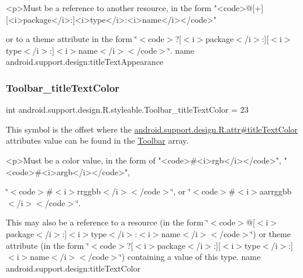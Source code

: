 \begin{DoxyVerb}      <p>Must be a reference to another resource, in the form "<code>@[+][<i>package</i>:]<i>type</i>:<i>name</i></code>"
\end{DoxyVerb}
 or to a theme attribute in the form \char`\"{}$<$code$>$?\mbox{[}$<$i$>$package$<$/i$>$\+:\mbox{]}\mbox{[}$<$i$>$type$<$/i$>$\+:\mbox{]}$<$i$>$name$<$/i$>$$<$/code$>$\char`\"{}.  name android.\+support.\+design\+:title\+Text\+Appearance \mbox{\label{classandroid_1_1support_1_1design_1_1R_1_1styleable_a604b5e782f3ef15da00397e90979933b}} 
\subsubsection{\texorpdfstring{Toolbar\+\_\+title\+Text\+Color}{Toolbar\_titleTextColor}}
{\footnotesize\ttfamily int android.\+support.\+design.\+R.\+styleable.\+Toolbar\+\_\+title\+Text\+Color = 23\hspace{0.3cm}{\ttfamily [static]}}

This symbol is the offset where the \hyperlink{classandroid_1_1support_1_1design_1_1R_1_1attr_a08459d5006ee4c06955351a45afbcbf0}{android.\+support.\+design.\+R.\+attr\#title\+Text\+Color} attribute\textquotesingle{}s value can be found in the \hyperlink{classandroid_1_1support_1_1design_1_1R_1_1styleable_a7783ebe780dbe2a845802a40519a46e9}{Toolbar} array.

\begin{DoxyVerb}      <p>Must be a color value, in the form of "<code>#<i>rgb</i></code>", "<code>#<i>argb</i></code>",
\end{DoxyVerb}
 \char`\"{}$<$code$>$\#$<$i$>$rrggbb$<$/i$>$$<$/code$>$\char`\"{}, or \char`\"{}$<$code$>$\#$<$i$>$aarrggbb$<$/i$>$$<$/code$>$\char`\"{}. 

This may also be a reference to a resource (in the form \char`\"{}$<$code$>$@\mbox{[}$<$i$>$package$<$/i$>$\+:\mbox{]}$<$i$>$type$<$/i$>$\+:$<$i$>$name$<$/i$>$$<$/code$>$\char`\"{}) or theme attribute (in the form \char`\"{}$<$code$>$?\mbox{[}$<$i$>$package$<$/i$>$\+:\mbox{]}\mbox{[}$<$i$>$type$<$/i$>$\+:\mbox{]}$<$i$>$name$<$/i$>$$<$/code$>$\char`\"{}) containing a value of this type.  name android.\+support.\+design\+:title\+Text\+Color \mbox{\label{classandroid_1_1support_1_1design_1_1R_1_1styleable_ae848bcf5b638b9248537d28ebf90c67f}} 
